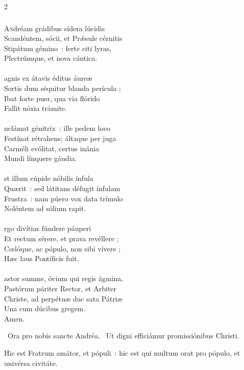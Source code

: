 \documentclass[9pt,twoside]{extarticle}
\begin{document}
\begin{multicols}{2}
{{\subsubsection*{\center {}}
\lettrine{A}ndréam grádibus sídera lúcidis\\
Scandéntem, sócii, et Prǽsule cérnitis\\
Stipátum gémino~: ferte citi lyras,\\
Plectrúmque, et nova cántica.\\
\\
agnis ex átavis éditus áureæ\\
Sortis dum séquitur blanda perícula ;\\
Ibat forte puer, qua via flórido\\
Fallit nóxia trámite.\\
\\
nclámat génitrix~: ille pedem loco\\
Festínat rétrahens; áltaque per juga\\
Carméli evólitat, certus inánia\\
Mundi línquere gáudia.\\
\\
st illum cúpide nóbilis ínfula\\
Quærit~: sed látitans défugit ínfulam\\
Frustra~: nam púero vox data trímulo\\
Noléntem ad sólium rapit.\\
\\
rgo divítias fúndere páuperi\\
Et rectum sérere, et prava revéllere ;\\
Cœlóque, ac pópulo, non sibi vívere ;\\
Hæc laus Pontíficis fuit.\\
\\
astor summe, óvium qui regis ágmina,\\
Pastórum páriter Rector, et Arbiter\\
Christe, ad perpétuæ duc sata Pátriæ\\
Una cum dúcibus gregem.\\
Amen.

\begin{tightlist}{}
\item {}~Ora pro nobis sancte Andréa. ~Ut digni efficiámur promissiónibus Christi.
\item {} Hic est Fratrum amátor, et pópuli~: hic est qui multum orat pro pópulo, et univérsa civitáte.
\end{tightlist}

}}
\end{multicols}
\end{document}
